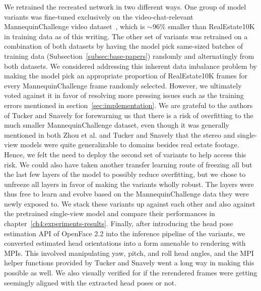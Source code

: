 We retrained the recreated network in two different ways. One group of model variants was fine-tuned exclusively on the video-chat-relevant MannequinChallenge video dataset~\cite{li2019learning}, which is $\sim$96\% smaller than RealEstate10K in training data as of this writing. The other set of variants was retrained on a combination of both datasets by having the model pick same-sized batches of training data (Subsection~\ref{subsec:base-papers}) randomly and alternatingly from both datasets. We considered addressing this inherent data imbalance problem by making the model pick an appropriate proportion of RealEstate10K frames for every MannequinChallenge frame randomly selected. However, we ultimately voted against it in favor of resolving more pressing issues such as the training errors mentioned in section~\ref{sec:implementation}. We are grateful to the authors of Tucker and Snavely for forewarning us that there is a risk of overfitting to the much smaller MannequinChallenge dataset, even though it was generally mentioned in both Zhou et al. and Tucker and Snavely that the stereo and single-view models were quite generalizable to domains besides real estate footage. Hence, we felt the need to deploy the second set of variants to help access this risk. We could also have taken another transfer learning route of freezing all but the last few layers of the model to possibly reduce overfitting, but we chose to unfreeze all layers in favor of making the variants wholly robust. The layers were thus free to learn and evolve based on the MannequinChallenge data they were newly exposed to. We stack these variants up against each other and also against the pretrained single-view model and compare their performances in chapter~\ref{ch4:experiments-results}. Finally, after introducing the head pose estimation API of OpenFace 2.2 into the inference pipeline of the variants, we converted estimated head orientations into a form amenable to rendering with MPIs. This involved manipulating yaw, pitch, and roll head angles, and the MPI helper functions provided by Tucker and Snavely went a long way in making this possible as well. We also visually verified for if the rerendered frames were getting seemingly aligned with the extracted head poses or not.




